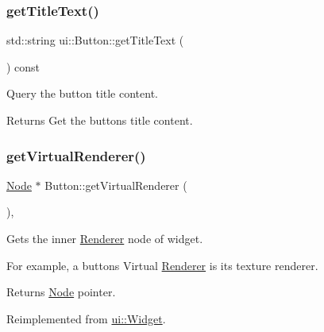 \subsubsection{\texorpdfstring{get\+Title\+Text()}{getTitleText()}\hspace{0.1cm}{\footnotesize\ttfamily [2/2]}}
{\footnotesize\ttfamily std\+::string ui\+::\+Button\+::get\+Title\+Text (\begin{DoxyParamCaption}{ }\end{DoxyParamCaption}) const}

Query the button title content. \begin{DoxyReturn}{Returns}
Get the button\textquotesingle{}s title content. 
\end{DoxyReturn}
\mbox{\label{classui_1_1Button_afa2bf5862c2e1893a34fbf88e5294fa3}} 
\subsubsection{\texorpdfstring{get\+Virtual\+Renderer()}{getVirtualRenderer()}\hspace{0.1cm}{\footnotesize\ttfamily [1/2]}}
{\footnotesize\ttfamily \hyperlink{classNode}{Node} $\ast$ Button\+::get\+Virtual\+Renderer (\begin{DoxyParamCaption}{ }\end{DoxyParamCaption})\hspace{0.3cm}{\ttfamily [override]}, {\ttfamily [virtual]}}

Gets the inner \hyperlink{classRenderer}{Renderer} node of widget.

For example, a button\textquotesingle{}s Virtual \hyperlink{classRenderer}{Renderer} is it\textquotesingle{}s texture renderer.

\begin{DoxyReturn}{Returns}
\hyperlink{classNode}{Node} pointer. 
\end{DoxyReturn}


Reimplemented from \hyperlink{classui_1_1Widget_acf862bf9235fbb3823819eeb65d46f25}{ui\+::\+Widget}.

\mbox{\label{classui_1_1Button_ace7b0c2ed9f13afbc3f5979cf7a84747}} 

